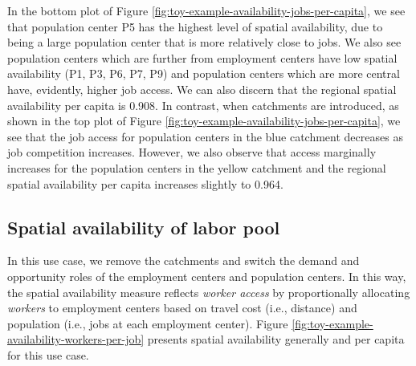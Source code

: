 \documentclass[]{elsarticle} %
\begin{document}
In the bottom plot of Figure
\ref{fig:toy-example-availability-jobs-per-capita}, we see that
population center P5 has the highest level of spatial availability, due
to being a large population center that is more relatively close to
jobs. We also see population centers which are further from employment
centers have low spatial availability (P1, P3, P6, P7, P9) and
population centers which are more central have, evidently, higher job
access. We can also discern that the regional spatial availability per
capita is 0.908. In contrast, when catchments are introduced, as shown
in the top plot of Figure
\ref{fig:toy-example-availability-jobs-per-capita}, we see that the job
access for population centers in the blue catchment decreases as job
competition increases. However, we also observe that access marginally
increases for the population centers in the yellow catchment and the
regional spatial availability per capita increases slightly to 0.964.

\hypertarget{spatial-availability-of-labor-pool}{%
\subsection{Spatial availability of labor
pool}\label{spatial-availability-of-labor-pool}}

In this use case, we remove the catchments and switch the demand and
opportunity roles of the employment centers and population centers. In
this way, the spatial availability measure reflects \emph{worker access}
by proportionally allocating \emph{workers} to employment centers based
on travel cost (i.e., distance) and population (i.e., jobs at each
employment center). Figure
\ref{fig:toy-example-availability-workers-per-job} presents spatial
availability generally and per capita for this use case.
\end{document}
